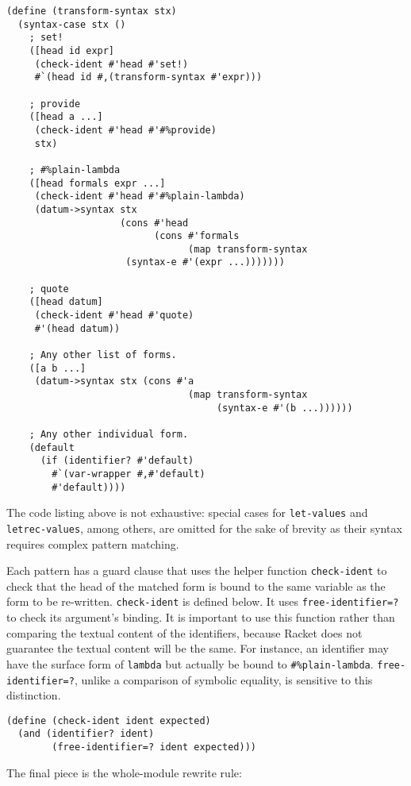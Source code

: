 \documentclass{article}
\begin{document}
\begin{lstlisting}
(define (transform-syntax stx)
  (syntax-case stx ()
    ; set!
    ([head id expr]
     (check-ident #'head #'set!)
     #`(head id #,(transform-syntax #'expr)))

    ; provide
    ([head a ...]
     (check-ident #'head #'#%provide)
     stx)

    ; #%plain-lambda
    ([head formals expr ...]
     (check-ident #'head #'#%plain-lambda)
     (datum->syntax stx
                    (cons #'head
                          (cons #'formals
                                (map transform-syntax
				     (syntax-e #'(expr ...)))))))

    ; quote
    ([head datum]
     (check-ident #'head #'quote)
     #'(head datum))

    ; Any other list of forms.
    ([a b ...]
     (datum->syntax stx (cons #'a
                                (map transform-syntax
                                     (syntax-e #'(b ...))))))

    ; Any other individual form.
    (default
      (if (identifier? #'default)
        #`(var-wrapper #,#'default)
        #'default))))
\end{lstlisting}

The code listing above is not exhaustive: special cases for \texttt{let-values} and \texttt{letrec-values}, among others, are omitted for the sake of brevity as their syntax requires complex pattern matching.

Each pattern has a guard clause that uses the helper function \texttt{check-ident} to check that the head of the matched form is bound to the same variable as the form to be re-written. \texttt{check-ident} is defined below. It uses \texttt{free-identifier=?} to check its argument's binding. It is important to use this function rather than comparing the textual content of the identifiers, because Racket does not guarantee the textual content will be the same. For instance, an identifier may have the surface form of \texttt{lambda} but actually be bound to \texttt{\#\%plain-lambda}. \texttt{free-identifier=?}, unlike a comparison of symbolic equality, is sensitive to this distinction.

\begin{lstlisting}
(define (check-ident ident expected)
  (and (identifier? ident)
        (free-identifier=? ident expected)))
\end{lstlisting}

The final piece is the whole-module rewrite rule:
\end{document}
